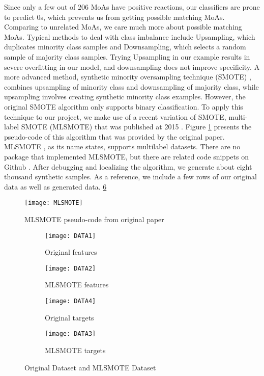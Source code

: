 \documentclass[11.5pt]{article}
\begin{document}
Since only a few out of 206 MoAs have positive reactions, our classifiers are prone to predict 0s, which prevents us from getting possible matching MoAs. Comparing to unrelated MoAs, we care much more about possible matching MoAs. Typical methods to deal with class imbalance include Upsampling, which duplicates minority class samples and Downsampling, which selects a random sample of majority class samples. Trying Upsampling in our example results in severe overfitting in our model, and downsampling does not improve specificity. A more advanced method, synthetic minority oversampling technique (SMOTE) \cite{smote}, combines upsampling of minority class and downsampling of majority class, while upsampling involves creating synthetic minority class examples. However, the original SMOTE algorithm only supports binary classification. To apply this technique to our project, we make use of a recent variation of SMOTE, multi-label SMOTE (MLSMOTE) that was published at 2015 \cite{mlsmotepaper}. Figure \ref{fig:mlsmote} presents the pseudo-code of this algorithm that was provided by the original paper. MLSMOTE , as its name states, supports multilabel datasets. There are no package that implemented MLSMOTE, but there are related code snippets on Github \cite{mlsmoteweb}. After debugging and localizing the algorithm, we generate about eight thousand synthetic samples. As a reference, we include a few rows of our original data as well as generated data. \ref{fig:d}


\begin{figure}[htb]
  \centering
    \texttt{[image: MLSMOTE]}
  \caption{MLSMOTE pseudo-code from original paper}
  \label{fig:mlsmote}
\end{figure}



\begin{figure}[htb]
\begin{subfigure}[b]{0.5\textwidth}
  \texttt{[image: DATA1]}
  \caption{Original features}
  \label{fig:d1}
  \end{subfigure}
  \begin{subfigure}[b]{0.5\textwidth}
  \texttt{[image: DATA2]}
   \caption{MLSMOTE features}
  \label{fig:d2}
  \end{subfigure}
  
 \begin{subfigure}[b]{0.5\textwidth}
  \texttt{[image: DATA4]}
  \caption{Original targets}
  \label{fig:d3}
  \end{subfigure}
  \begin{subfigure}[b]{0.5\textwidth}
  \texttt{[image: DATA3]}
   \caption{MLSMOTE targets}
  \label{fig:d4}
  \end{subfigure}
\caption{Original Dataset and MLSMOTE Dataset}\label{fig:d}
\end{figure}
\end{document}
